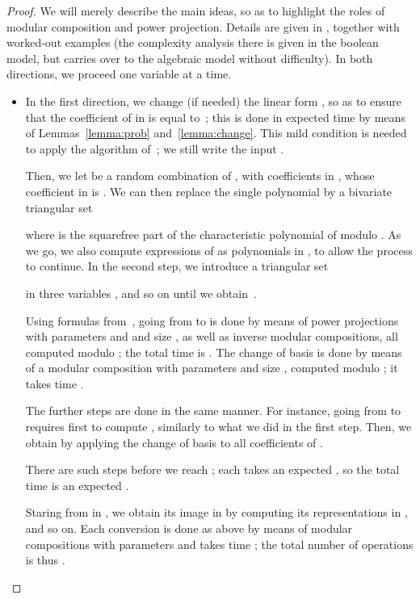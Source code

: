 \documentclass[12pt]{article}
\begin{document}
\begin{proof}
  We will merely describe the main ideas, so as to highlight the roles
  of modular composition and power projection. Details are given in
  \cite[Section~5.3 and~6.3]{PoSc10}, together with worked-out
  examples (the complexity analysis there is given in the boolean
  model, but carries over to the algebraic model without
  difficulty). In both directions, we proceed one variable at a time.
  \begin{itemize}
  \item In the first direction, we change (if needed) the linear form
    , so as to ensure that the coefficient of  in  is
    equal to~; this is done in expected time  by
    means of Lemmas~\ref{lemma:prob} and~\ref{lemma:change}. This mild
    condition is needed to apply the algorithm of~\cite{PoSc10}; we
    still write the input .

    Then, we let 
    be a random combination of , with coefficients
    in , whose coefficient in  is
    . We can then replace the single polynomial  by
    a bivariate triangular set
    
    where  is the squarefree part of the characteristic
    polynomial of 
    modulo . As we go, we also compute expressions of
     as polynomials in , to allow the process to 
    continue. In the second step, we introduce a triangular set
    
    in three variables , and so on until we
    obtain~.

    Using formulas from~\cite{PaSc06,PoSc10}, going from  to
     is done by means of power projections with
    parameters  and  and size , as
    well as inverse modular compositions, all computed modulo ; the total time is . The change of
    basis  is done by means of a modular
    composition with parameters  and size , computed modulo ; it takes time .

    The further steps are done in the same manner. For instance, going
    from  to 
    requires first to compute , similarly to
    what we did in the first step. Then, we obtain  by
    applying the change of basis  to all coefficients
    of .

    There are  such steps before we reach ; each takes an
    expected , so the total time is an expected
    .

    Staring from  in , we obtain its image
    in  by computing its representations in , and so on. Each conversion is done as
    above by means of modular compositions with parameters  and
    takes time ; the total number of operations is thus
    .


\end{itemize}
\end{proof}
\end{document}
